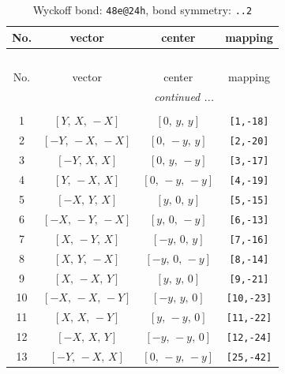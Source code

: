 \documentclass[fleqn,8pt]{jsarticle}
\begin{document}
\begin{longtable}{cccc}
\caption{Wyckoff bond: {\tt 48e@24h}, bond symmetry: {\tt ..2}}
 \\
 \hline \hline
No. & vector & center & mapping \\ \hline \endfirsthead

\multicolumn{3}{l}{\tablename\ \thetable{}} \\
 \hline \hline
No. & vector & center & mapping \\ \hline \endhead

 \hline \hline
\multicolumn{3}{r}{\footnotesize\it continued ...} \\ \endfoot

 \hline \hline
\multicolumn{3}{r}{} \\ \endlastfoot

1 & $\left[ Y,\, X,\, - X \right]$ & $\left[ 0,\, y,\, y \right]$ & {\tt [1,-18]} \\ \hline
2 & $\left[ - Y,\, - X,\, - X \right]$ & $\left[ 0,\, - y,\, y \right]$ & {\tt [2,-20]} \\ \hline
3 & $\left[ - Y,\, X,\, X \right]$ & $\left[ 0,\, y,\, - y \right]$ & {\tt [3,-17]} \\ \hline
4 & $\left[ Y,\, - X,\, X \right]$ & $\left[ 0,\, - y,\, - y \right]$ & {\tt [4,-19]} \\ \hline
5 & $\left[ - X,\, Y,\, X \right]$ & $\left[ y,\, 0,\, y \right]$ & {\tt [5,-15]} \\ \hline
6 & $\left[ - X,\, - Y,\, - X \right]$ & $\left[ y,\, 0,\, - y \right]$ & {\tt [6,-13]} \\ \hline
7 & $\left[ X,\, - Y,\, X \right]$ & $\left[ - y,\, 0,\, y \right]$ & {\tt [7,-16]} \\ \hline
8 & $\left[ X,\, Y,\, - X \right]$ & $\left[ - y,\, 0,\, - y \right]$ & {\tt [8,-14]} \\ \hline
9 & $\left[ X,\, - X,\, Y \right]$ & $\left[ y,\, y,\, 0 \right]$ & {\tt [9,-21]} \\ \hline
10 & $\left[ - X,\, - X,\, - Y \right]$ & $\left[ - y,\, y,\, 0 \right]$ & {\tt [10,-23]} \\ \hline
11 & $\left[ X,\, X,\, - Y \right]$ & $\left[ y,\, - y,\, 0 \right]$ & {\tt [11,-22]} \\ \hline
12 & $\left[ - X,\, X,\, Y \right]$ & $\left[ - y,\, - y,\, 0 \right]$ & {\tt [12,-24]} \\ \hline
13 & $\left[ - Y,\, - X,\, X \right]$ & $\left[ 0,\, - y,\, - y \right]$ & {\tt [25,-42]} \\ \hline

\end{longtable}
\end{document}
